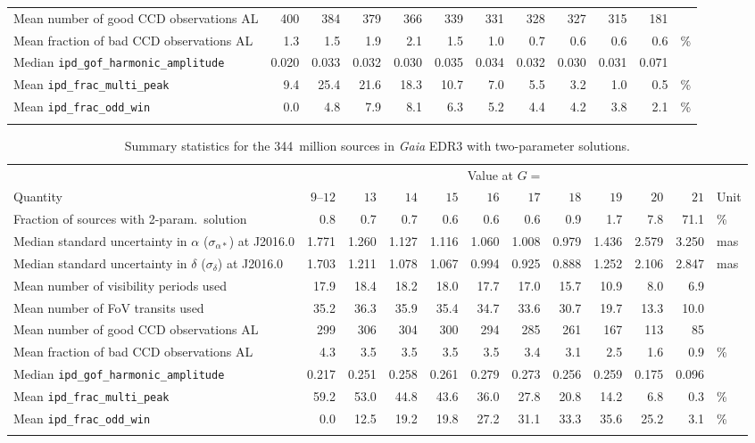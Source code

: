 \documentclass[longauth]{aa} %
\newcommand{\gacs}[1]{{\footnotesize\texttt{#1}}}
\begin{document}
\begin{table}[t]
\begin{tabular}{lrrrrrrrrrrl}
Mean number of good CCD observations AL & 400& 384& 379& 366& 339& 331& 328& 327& 315& 181&   \\
Mean fraction of bad CCD observations AL &  1.3&  1.5&  1.9&  2.1&  1.5&  1.0&  0.7&  0.6&  0.6&  0.6& \% \\
Median \gacs{ipd\_gof\_harmonic\_amplitude} & 0.020& 0.033& 0.032& 0.030& 0.035& 0.034& 0.032& 0.030& 0.031& 0.071&  \\
Mean \gacs{ipd\_frac\_multi\_peak} &  9.4& 25.4& 21.6& 18.3& 10.7&  7.0&  5.5&  3.2&  1.0&  0.5& \% \\
Mean \gacs{ipd\_frac\_odd\_win} &  0.0&  4.8&  7.9&  8.1&  6.3&  5.2&  4.4&  4.2&  3.8&  2.1& \% \\
\noalign{\smallskip}\hline
\end{tabular}
\end{table}


\begin{table}[t]
\caption{Summary statistics for the 344~million sources in \textit{Gaia} EDR3 with 
two-parameter solutions.
\label{tab:statP2}}
\small   \setlength{\tabcolsep}{4.5pt}
\begin{tabular}{lrrrrrrrrrrl}
\hline\hline
\noalign{\smallskip}
& \multicolumn{10}{c}{Value at $G=$} \\
Quantity & $9$--$12$& $13$ & $14$ & $15$ & $16$ & $17$ & $18$ & $19$ & $20$ & $21$ & Unit \\
\noalign{\smallskip}\hline\noalign{\smallskip}
Fraction of sources with 2-param.\ solution &  0.8&  0.7&  0.7&  0.6&  0.6&  0.6&  0.9&  1.7&  7.8& 71.1& \% \\
Median standard uncertainty in $\alpha$ ($\sigma_{\alpha*}$) at J2016.0 & 1.771& 1.260& 1.127& 1.116& 1.060& 1.008& 0.979& 1.436& 2.579& 3.250& mas \\
Median standard uncertainty in $\delta$ ($\sigma_{\delta}$) at J2016.0 & 1.703& 1.211& 1.078& 1.067& 0.994& 0.925& 0.888& 1.252& 2.106& 2.847& mas \\
Mean number of visibility periods used & 17.9& 18.4& 18.2& 18.0& 17.7& 17.0& 15.7& 10.9&  8.0&  6.9&   \\
Mean number of FoV transits used & 35.2& 36.3& 35.9& 35.4& 34.7& 33.6& 30.7& 19.7& 13.3& 10.0&   \\
Mean number of good CCD observations AL & 299& 306& 304& 300& 294& 285& 261& 167& 113& 85&   \\
Mean fraction of bad CCD observations AL &  4.3&  3.5&  3.5&  3.5&  3.5&  3.4&  3.1&  2.5&  1.6&  0.9& \% \\
Median \gacs{ipd\_gof\_harmonic\_amplitude} & 0.217& 0.251& 0.258& 0.261& 0.279& 0.273& 0.256& 0.259& 0.175& 0.096&  \\
Mean \gacs{ipd\_frac\_multi\_peak} & 59.2& 53.0& 44.8& 43.6& 36.0& 27.8& 20.8& 14.2&  6.8&  0.3& \% \\
Mean \gacs{ipd\_frac\_odd\_win} &  0.0& 12.5& 19.2& 19.8& 27.2& 31.1& 33.3& 35.6& 25.2&  3.1& \% \\
\noalign{\smallskip}\hline
\end{tabular}
\end{table}
\end{document}

